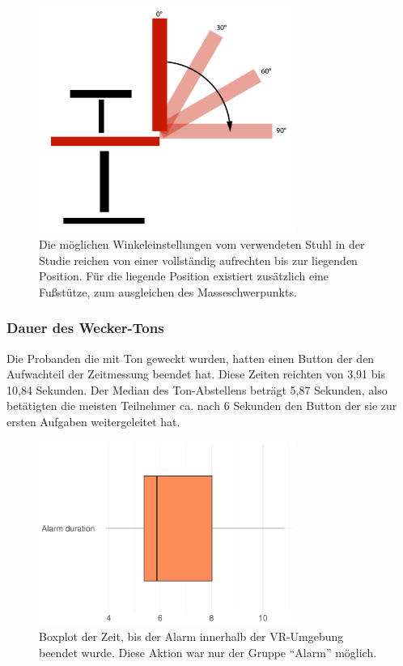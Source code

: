 \begin{figure}[H]
	\centering
	\includegraphics[width=0.75\textwidth]{./images/chair}
	\caption{Die möglichen Winkeleinstellungen vom verwendeten Stuhl in der Studie reichen von einer vollständig aufrechten bis zur liegenden Position. Für die liegende Position existiert zusätzlich eine Fußstütze, zum ausgleichen des Masseschwerpunkts.}
	\label{fig:chair_backrest}
\end{figure}

\subsubsection{Dauer des Wecker-Tons}

Die Probanden die mit Ton geweckt wurden, hatten einen Button der den Aufwachteil der Zeitmessung beendet hat. Diese Zeiten reichten von 3,91 bis 10,84 Sekunden. Der Median des Ton-Abstellens beträgt 5,87 Sekunden, also betätigten die meisten Teilnehmer ca. nach 6 Sekunden den Button der sie zur ersten Aufgaben weitergeleitet hat. 

\begin{figure}[H]
	\centering
	\includegraphics[width=0.75\textwidth]{./_StudyResults/alarmDurationHist}
	\caption{Boxplot der Zeit, bis der Alarm innerhalb der VR-Umgebung beendet wurde. Diese Aktion war nur der Gruppe "`Alarm"' möglich.}
	\label{fig:alarmDurationHist}
\end{figure}

